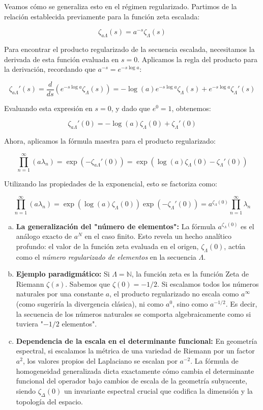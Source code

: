 Veamos cómo se generaliza esto en el régimen regularizado. Partimos de la relación establecida previamente para la función zeta escalada:

$$ \zeta_{a\Lambda}(s) = a^{-s} \zeta_\Lambda(s) $$

Para encontrar el producto regularizado de la secuencia escalada, necesitamos la derivada de esta función evaluada en $s=0$. Aplicamos la regla del producto para la derivación, recordando que $a^{-s} = e^{-s \log a}$:

$$ \zeta_{a\Lambda}'(s) = \frac{d}{ds} \left( e^{-s \log a} \zeta_\Lambda(s) \right) = -\log(a) e^{-s \log a} \zeta_\Lambda(s) + e^{-s \log a} \zeta_\Lambda'(s) $$

Evaluando esta expresión en $s=0$, y dado que $e^0 = 1$, obtenemos:

$$ \zeta_{a\Lambda}'(0) = -\log(a) \zeta_\Lambda(0) + \zeta_\Lambda'(0) $$

Ahora, aplicamos la fórmula maestra para el producto regularizado:

$$ \prod_{n=1}^{\infty} (a\lambda_n) = \exp(-\zeta_{a\Lambda}'(0)) = \exp\left( \log(a) \zeta_\Lambda(0) - \zeta_\Lambda'(0) \right) $$

Utilizando las propiedades de la exponencial, esto se factoriza como:

$$ \prod_{n=1}^{\infty} (a\lambda_n) = \exp(\log(a) \zeta_\Lambda(0)) \exp(-\zeta_\Lambda'(0)) = a^{\zeta_\Lambda(0)} \prod_{n=1}^{\infty} \lambda_n $$

\begin{enumerate}[a)]
    \item \textbf{La generalización del "número de elementos":} La fórmula $a^{\zeta_\Lambda(0)}$ es el análogo exacto de $a^N$ en el caso finito. Esto revela un hecho analítico profundo: el valor de la función zeta evaluada en el origen, $\zeta_\Lambda(0)$, actúa como el \textit{número regularizado de elementos} en la secuencia $\Lambda$. 
    \item \textbf{Ejemplo paradigmático:} Si $\Lambda = \mathbb{N}$, la función zeta es la función Zeta de Riemann $\zeta(s)$. Sabemos que $\zeta(0) = -1/2$. Si escalamos todos los números naturales por una constante $a$, el producto regularizado no escala como $a^\infty$ (como sugeriría la divergencia clásica), ni como $a^0$, sino como $a^{-1/2}$. Es decir, la secuencia de los números naturales se comporta algebraicamente como si tuviera "$-1/2$ elementos".
    \item \textbf{Dependencia de la escala en el determinante funcional:} En geometría espectral, si escalamos la métrica de una variedad de Riemann por un factor $a^2$, los valores propios del Laplaciano se escalan por $a^{-2}$. La fórmula de homogeneidad generalizada dicta exactamente cómo cambia el determinante funcional del operador bajo cambios de escala de la geometría subyacente, siendo $\zeta_\Delta(0)$ un invariante espectral crucial que codifica la dimensión y la topología del espacio.
\end{enumerate}

